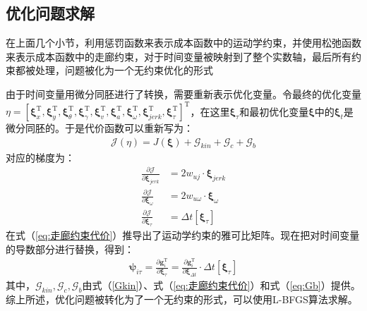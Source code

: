 \documentclass[master,academic]{ysuthesis} %
\begin{document}
		\subsection{优化问题求解}
		在上面几个小节，利用惩罚函数来表示成本函数中的运动学约束，并使用松弛函数来表示成本函数中的走廊约束，对于时间变量被映射到了整个实数轴，最后所有约束都被处理，问题被化为一个无约束优化的形式

		由于时间变量用微分同胚进行了转换，需要重新表示优化变量。令最终的优化变量$\eta =\left[ \bm{\xi} _{x}^{\mathrm{T}},\bm{\xi} _{y}^{\mathrm{T}},\bm{\xi} _{\theta}^{\mathrm{T}},\bm{\xi} _{\gamma}^{\mathrm{T}},\bm{\xi} _{v}^{\mathrm{T}},\bm{\xi} _{a}^{\mathrm{T}},\bm{\xi} _{\omega}^{\mathrm{T}},\bm{\xi} _{jerk}^{\mathrm{T}},\bm{\xi} _{\tau}^{\mathrm{T}} \right] ^{\mathrm{T}}$，在这里$\bm{\xi} _{\tau}$和最初优化变量$\bm{\xi}$中的$\bm{\xi} _{t}$是微分同胚的。于是代价函数可以重新写为：
		\begin{equation}
			\begin{aligned}
				\mathcal{J}\left( \eta \right) =J\left( \bm{\xi} \right) +\mathcal{G}_{kin}+\mathcal{G}_c+\mathcal{G}_b
			\end{aligned}
		\end{equation}
		对应的梯度为：
		\begin{equation}
			\begin{aligned}
				\frac{\partial \mathcal{J}}{\partial \bm{\xi} _{jerk}}&=2w_{uj}\cdot \bm{\xi} _{jerk}\\
				\frac{\partial \mathcal{J}}{\partial \bm{\xi} _{\omega}}&=2w_{u\omega}\cdot \bm{\xi} _{\omega}\\
				\frac{\partial \mathcal{J}}{\partial \bm{\xi} _{\tau}}&=\Delta t\left[ \bm{\xi} _{\tau} \right]
			\end{aligned}
		\end{equation}
		在式（\ref{eq:走廊约束代价}）推导出了运动学约束的雅可比矩阵。现在把对时间变量的导数部分进行替换，得到：
		\begin{equation}
			\begin{aligned}
				\bm{\psi} _{i\tau}=\frac{\partial \bm{g}_{i}^{\mathrm{T}}}{\partial \bm{\xi} _{\tau}}=\frac{\partial \bm{g}_{i}^{\mathrm{T}}}{\partial \bm{\xi} _{\Delta t}}\cdot \Delta t\left[ \bm{\xi} _{\tau} \right] 
			\end{aligned}
		\end{equation}
		其中，$\mathcal{G}_{kin},\mathcal{G}_c,\mathcal{G}_b$由式（\ref{Gkin}）、式（\ref{eq:走廊约束代价}）和式（\ref{eq:Gb}）提供。
		综上所述，优化问题被转化为了一个无约束的形式，可以使用L-BFGS算法求解。
\end{document}
